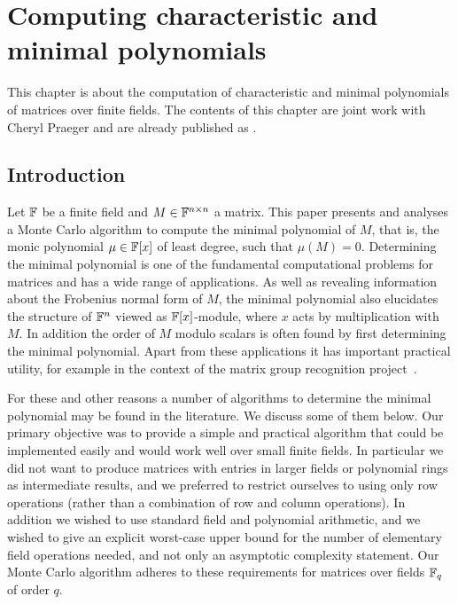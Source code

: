 
\chapter{Computing characteristic and minimal polynomials}
\label{chap:charminpoly}
%

This chapter is about the computation of characteristic and minimal
polynomials of matrices over finite fields. The contents of this
chapter are joint work with Cheryl
Praeger and are already published as \cite{minpolypaper}.

\section{Introduction}

Let $\mathbb{F}$ be a finite field and $M \in \mathbb{F}^{n \times n}$ a matrix. This paper
presents and analyses a Monte Carlo  algorithm to compute the minimal 
polynomial of $M$, that is,
the monic polynomial $\mu \in \mathbb{F}[x]$ of least degree, such that
$\mu(M) = 0$. 
Determining the minimal polynomial is one of the fundamental computational
problems for matrices and has a wide range of applications. As well as 
revealing information about the Frobenius
normal form of $M$, the minimal polynomial also elucidates the structure 
of $\mathbb{F}^n$ viewed as $\mathbb{F}[x]$-module, where $x$ acts by multiplication with $M$. 
In addition the order of $M$ modulo scalars is often found by first 
determining the minimal polynomial. Apart from these applications it has
important practical utility, for example
in the context of the matrix group recognition project~\cite{OB}.

For these and other reasons a number of algorithms to determine the 
minimal polynomial may be found in the literature. We discuss some 
of them below. Our primary objective 
was to provide a simple and practical algorithm that could be 
implemented easily and would work well over small finite fields. In
particular we did not want to produce matrices with entries in 
larger fields or polynomial rings as intermediate results, 
and we preferred to restrict ourselves to using only row operations 
(rather than a combination of row and column operations). 
In addition we wished to use standard field and polynomial arithmetic,
and we wished to give  an explicit worst-case upper bound
for the number of elementary field operations needed, and not only an
asymptotic complexity statement.
Our Monte Carlo algorithm adheres to these requirements for matrices 
over fields $\mathbb{F}_q$ of order $q$.

